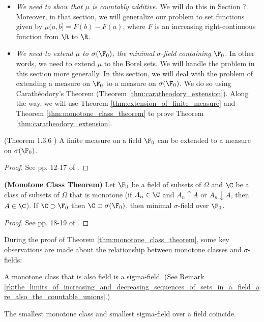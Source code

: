 \documentclass{article} %
\newcommand{\Caratheodory}{Carath\'eodory}
\begin{document}
\begin{itemize}
\item \textit{We need to show that $\mu$ is countably additive.} We will do this in Section ?.   Moreover, in that section, we will generalize our problem to set functions given by $\mu(a,b] = F(b)-F(a)$, where $F$ is an increasing right-continuous function from $\R$ to $\R$.
\item \textit{We need to extend $\mu$ to $\sigma(\F_0)$, the minimal $\sigma$-field containing $\F_0$.} In other words, we need to extend $\mu$ to the Borel sets.  We will handle the problem in this section more generally.  In this section, we will deal with the problem of extending a measure on $\F_0$ to a measure on $\sigma(\F_0)$. We do so using \Caratheodory's Theorem  (Theorem \ref{thm:caratheodory_extension}).  Along the way, we will use Theorem \ref{thm:extension_of_finite_measure} and Theorem \ref{thm:monotone_class_theorem} to prove Theorem \ref{thm:caratheodory_extension}. 
\end{itemize}

 \begin{theorem}
 (Theorem 1.3.6 \cite{ash2000probability}) A finite measure on a field $\F_0$ can be extended to a measure on $\sigma(\F_0)$. 	
 \label{thm:extension_of_finite_measure}
 \end{theorem}

\begin{proof}
See pp. 12-17 of \cite{ash2000probability}.	
\end{proof}

\begin{theorem}{\textbf{(Monotone Class Theorem)}}
Let $\F_0$ be a field of subsets of $\Omega$ and $\C$ be a class of subsets of $\Omega$ that is monotone (if $A_n \in \C$ and $A_n \uparrow 
A$ or $A_n \downarrow A$, then $A \in \C$).  If $\C \supset \F_0$ then $\C \supset \sigma(\F_0)$, then minimal $\sigma$-field over $\F_0$. 
 \label{thm:monotone_class_theorem}
\end{theorem}

\begin{proof}
See pp. 18-19 of \cite{ash2000probability}.	
\end{proof}

\begin{remark}
During the proof of Theorem \ref{thm:monotone_class_theorem}, some key observations are made about the relationship between monotone classes and $\sigma$-fields:
\begin{alphabate}
\item A monotone class that is also field is a sigma-field.  (See Remark \ref{rk:the_limits_of_increasing_and_decreasing_sequences_of_sets_in_a_field_are_also_the_countable_unions}.)
\item The smallest monotone class and smallest sigma-field over a field coincide. 
\end{alphabate}
\label{rk:monotone_classes_and_sigma_fields}
\end{remark}
\end{document}
